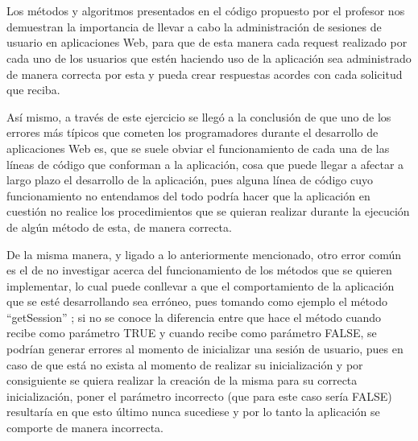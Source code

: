 \documentclass[10pt,a4paper]{article} %
\begin{document}
\section{}
{\large Los m{\' e}todos y algoritmos presentados en el c{\' o}digo propuesto por el profesor nos demuestran la importancia de llevar a cabo la administraci{\' o}n de sesiones de usuario en aplicaciones Web, para que de esta manera cada request realizado por cada uno de los usuarios que est{\' e}n haciendo uso de la aplicaci{\' o}n sea administrado de manera correcta por esta y pueda crear respuestas acordes con cada solicitud que reciba. 


\vspace{0.5cm}
As{\' i} mismo, a trav{\' e}s de este ejercicio se lleg{\' o} a la conclusi{\' o}n de que uno de los errores m{\' a}s t{\' i}picos  que cometen los programadores durante el desarrollo de aplicaciones Web es, que se suele obviar el funcionamiento de cada una de las l{\' i}neas de c{\' o}digo que conforman a la aplicaci{\' o}n, cosa que puede llegar a afectar a largo plazo el desarrollo de la aplicaci{\' o}n, pues alguna l{\' i}nea de c{\' o}digo cuyo funcionamiento no entendamos del todo podr{\' i}a hacer que la aplicaci{\' o}n en cuesti{\' o}n no realice los procedimientos que se quieran realizar durante la ejecuci{\' o}n de alg{\' u}n m{\' e}todo de esta, de manera correcta. 


\vspace{0.5cm}
De la misma manera, y ligado a lo anteriormente mencionado, otro error com{\' u}n es el de no investigar acerca del funcionamiento de los m{\' e}todos que se quieren implementar, lo cual puede conllevar a que el comportamiento de la aplicaci{\' o}n que se est{\' e} desarrollando sea err{\' o}neo, pues tomando como ejemplo el m{\' e}todo ``getSession'' ; si no se conoce la diferencia entre que hace el m{\' e}todo cuando recibe como par{\' a}metro TRUE y cuando recibe como par{\' a}metro FALSE, se podr{\' i}an generar errores al momento de inicializar una sesi{\' o}n de usuario, pues en caso de que est{\' a} no exista al momento de realizar su inicializaci{\' o}n y por consiguiente se quiera realizar la creaci{\' o}n de la misma para su correcta inicializaci{\' o}n, poner el par{\' a}metro incorrecto (que para este caso ser{\' i}a FALSE) resultar{\' i}a en que esto {\' u}ltimo nunca sucediese y por lo tanto la aplicaci{\' o}n se comporte de manera incorrecta.}

\end{document}

